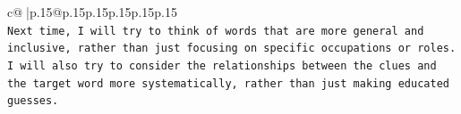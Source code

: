 \documentclass{article}
\begin{document}
{\begin{supertabular}{c@{$\;$}|p{.15\linewidth}@{}p{.15\linewidth}p{.15\linewidth}p{.15\linewidth}p{.15\linewidth}p{.15\linewidth}}
{{{\\ 
\texttt{Next time, I will try to think of words that are more general and inclusive, rather than just focusing on specific occupations or roles. I will also try to consider the relationships between the clues and the target word more systematically, rather than just making educated guesses.} \\
            }
        }
    }
     \\ \\

\end{supertabular}
}
\end{document}
